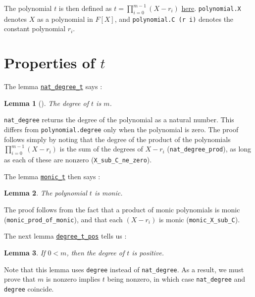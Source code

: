 \documentclass{article}
\newtheorem{lemma}{Lemma}
\theoremstyle{definition}
\theoremstyle{remark}
\begin{document}
The polynomial $t$ is then defined as $t = \prod_{i = 0}^{m - 1} (X - r_i)$ \href{https://github.com/BoltonBailey/formal-snarks-project/blob/7fd9cd122f5887f88f6a706b4f2a68a7153c7381/src/snarks/babysnark/knowledge_soundness.lean#L66}{here}. 
\texttt{polynomial.X} denotes $X$ as a polynomial in $F[X]$, and \texttt{polynomial.C (r i)} denotes the constant polynomial $r_i$.

\section{Properties of $t$}
The lemma \href{https://github.com/BoltonBailey/formal-snarks-project/blob/7fd9cd122f5887f88f6a706b4f2a68a7153c7381/src/snarks/babysnark/knowledge_soundness.lean#L71}{\texttt{nat\_degree\_t}} says : 
\theoremstyle{Lemma}
\begin{lemma}[]
  The degree of $t$ is $m$.  
\end{lemma}

\texttt{nat\_degree} returns the degree of the polynomial as a natural number. This differs from \texttt{polynomial.degree} only when the polynomial is zero. 
The proof follows simply by noting that the degree of the product of the polynomials $\prod_{i = 0}^{m - 1} (X - r_i)$ is the sum of the degrees of $X - r_i$ (\texttt{nat\_degree\_prod}), as long as each of these are nonzero (\texttt{X\_sub\_C\_ne\_zero}).

The lemma \href{https://github.com/BoltonBailey/formal-snarks-project/blob/7fd9cd122f5887f88f6a706b4f2a68a7153c7381/src/snarks/babysnark/knowledge_soundness.lean#L82}{\texttt{monic\_t}} then says :
\theoremstyle{lemma}
\begin{lemma} \label{monic_t}
  The polynomial $t$ is monic.
\end{lemma}
The proof follows from the fact that a product of monic polynomials is monic (\texttt{monic\_prod\_of\_monic}), and that each $(X - r_i)$ is monic (\texttt{monic\_X\_sub\_C}).

The next lemma \href{https://github.com/BoltonBailey/formal-snarks-project/blob/7fd9cd122f5887f88f6a706b4f2a68a7153c7381/src/snarks/babysnark/knowledge_soundness.lean#L91}{\texttt{degree\_t\_pos}} tells us :
\theoremstyle{lemma}
\begin{lemma} \label{t_pos}
  If $0 < m$, then the degree of $t$ is positive.
\end{lemma}
Note that this lemma uses \texttt{degree} instead of \texttt{nat\_degree}. As a result, we must prove that $m$ is nonzero implies $t$ being nonzero, in which case \texttt{nat\_degree} and \texttt{degree} coincide. 
\end{document}
